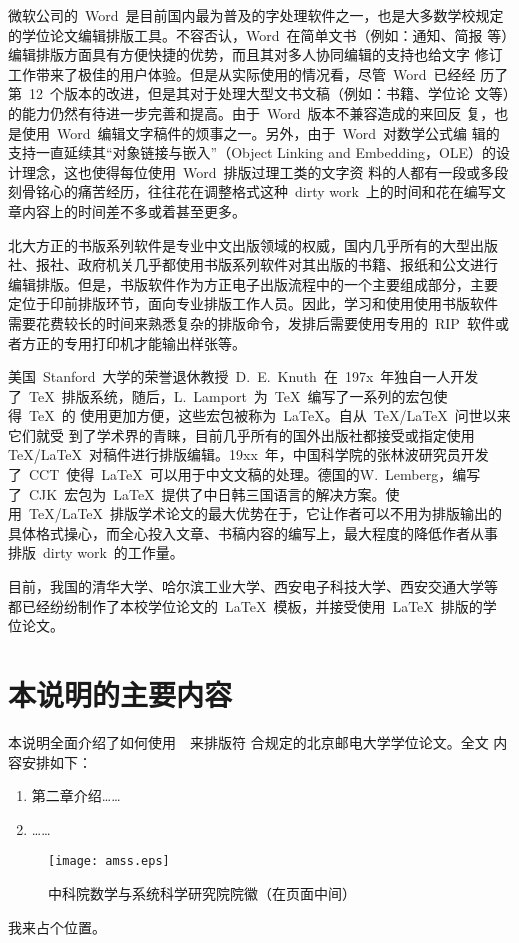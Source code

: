 微软公司的~Word~是目前国内最为普及的字处理软件之一，也是大多数学校规定
的学位论文编辑排版工具。不容否认，Word~在简单文书（例如：通知、简报
等）编辑排版方面具有方便快捷的优势，而且其对多人协同编辑的支持也给文字
修订工作带来了极佳的用户体验。但是从实际使用的情况看，尽管~Word~已经经
历了第~12~个版本的改进，但是其对于处理大型文书文稿（例如：书籍、学位论
文等）的能力仍然有待进一步完善和提高。由于~Word~版本不兼容造成的来回反
复，也是使用~Word~编辑文字稿件的烦事之一。另外，由于~Word~对数学公式编
辑的支持一直延续其“对象链接与嵌入”（Object Linking and
Embedding，OLE）的设计理念，这也使得每位使用~Word~排版过理工类的文字资
料的人都有一段或多段刻骨铭心的痛苦经历，往往花在调整格式这种~dirty
work~上的时间和花在编写文章内容上的时间差不多或着甚至更多。

北大方正的书版系列软件是专业中文出版领域的权威，国内几乎所有的大型出版
社、报社、政府机关几乎都使用书版系列软件对其出版的书籍、报纸和公文进行
编辑排版。但是，书版软件作为方正电子出版流程中的一个主要组成部分，主要
定位于印前排版环节，面向专业排版工作人员。因此，学习和使用使用书版软件
需要花费较长的时间来熟悉复杂的排版命令，发排后需要使用专用的~RIP~软件或
者方正的专用打印机才能输出样张等。

美国~Stanford~大学的荣誉退休教授~D.~E.~Knuth~在~197x~年独自一人开发
了~\TeX~排版系统，随后，L.~Lamport~为~\TeX~编写了一系列的宏包使得~\TeX~的
使用更加方便，这些宏包被称为~\LaTeX。自从~\TeX/\LaTeX~问世以来它们就受
到了学术界的青睐，目前几乎所有的国外出版社都接受或指定使用~
\TeX/\LaTeX~对稿件进行排版编辑。19xx~年，中国科学院的张林波研究员开发
了~CCT~使得~\LaTeX~可以用于中文文稿的处理。德国的W.~Lemberg，编写
了~CJK~宏包为~\LaTeX~提供了中日韩三国语言的解决方案。使
用~\TeX/\LaTeX~排版学术论文的最大优势在于，它让作者可以不用为排版输出的
具体格式操心，而全心投入文章、书稿内容的编写上，最大程度的降低作者从事
排版~dirty work~的工作量。

目前，我国的清华大学、哈尔滨工业大学、西安电子科技大学、西安交通大学等
都已经纷纷制作了本校学位论文的~\LaTeX~模板，并接受使用~\LaTeX~排版的学
位论文。

\section{本说明的主要内容}
本说明全面介绍了如何使用~\BUPTThesis~来排版符
合规定的北京邮电大学学位论文。全文
内容安排如下：

\begin{enumerate}
\item 第二章介绍……
\item ……
\end{enumerate}

\begin{figure}[h]
 \centering
 \texttt{[image: amss.eps]}
 \caption{中科院数学与系统科学研究院院徽（在页面中间）}
 \label{fig:amss1}
\end{figure}

我来占个位置。\cite{BUPT_Thesis_Format_2004}

\ifx\usechapbib\empty


\fi

